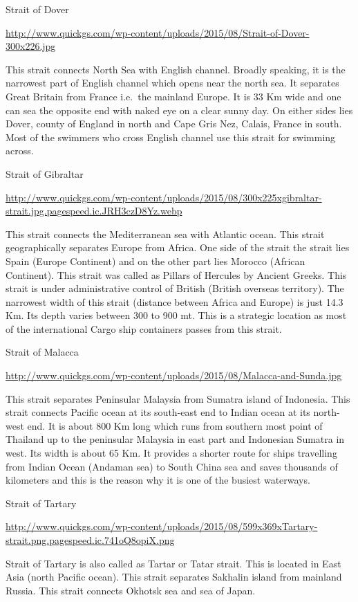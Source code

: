 \documentclass[
  openany]{book}
\begin{document}
Strait of Dover

\url{http://www.quickgs.com/wp-content/uploads/2015/08/Strait-of-Dover-300x226.jpg}

This strait connects North Sea with English channel. Broadly speaking, it is the narrowest part of English channel which opens near the north sea. It separates Great Britain from France i.e.~the mainland Europe. It is 33 Km wide and one can sea the opposite end with naked eye on a clear sunny day. On either sides lies Dover, county of England in north and Cape Gris Nez, Calais, France in south. Most of the swimmers who cross English channel use this strait for swimming across.

Strait of Gibraltar

\url{http://www.quickgs.com/wp-content/uploads/2015/08/300x225xgibraltar-strait.jpg.pagespeed.ic.JRH3czD8Yz.webp}

This strait connects the Mediterranean sea with Atlantic ocean. This strait geographically separates Europe from Africa. One side of the strait the strait lies Spain (Europe Continent) and on the other part lies Morocco (African Continent). This strait was called as Pillars of Hercules by Ancient Greeks. This strait is under administrative control of British (British overseas territory). The narrowest width of this strait (distance between Africa and Europe) is just 14.3 Km. Its depth varies between 300 to 900 mt. This is a strategic location as most of the international Cargo ship containers passes from this strait.

Strait of Malacca

\url{http://www.quickgs.com/wp-content/uploads/2015/08/Malacca-and-Sunda.jpg}

This strait separates Peninsular Malaysia from Sumatra island of Indonesia. This strait connects Pacific ocean at its south-east end to Indian ocean at its north-west end. It is about 800 Km long which runs from southern most point of Thailand up to the peninsular Malaysia in east part and Indonesian Sumatra in west. Its width is about 65 Km. It provides a shorter route for ships travelling from Indian Ocean (Andaman sea) to South China sea and saves thousands of kilometers and this is the reason why it is one of the busiest waterways.

Strait of Tartary

\url{http://www.quickgs.com/wp-content/uploads/2015/08/599x369xTartary-strait.png.pagespeed.ic.741oQ8opiX.png}

Strait of Tartary is also called as Tartar or Tatar strait. This is located in East Asia (north Pacific ocean). This strait separates Sakhalin island from mainland Russia. This strait connects Okhotsk sea and sea of Japan.
\end{document}
